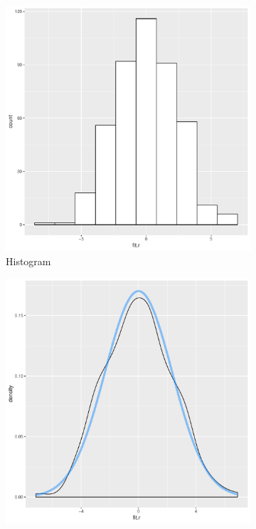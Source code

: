 \documentclass[11pt,openany]{book}\usepackage[]{graphicx}\usepackage[]{color}
\begin{document}
{\begin{figure}
        \centering
        \begin{subfigure}[b]{0.4\textwidth}
                \centering
                \includegraphics[width=\textwidth]{15_Diagnostics/multresidhist2.pdf} %
                \caption{Histogram \label{fig:multresidhist2}}
        \end{subfigure}
        \begin{subfigure}[b]{0.4\textwidth}
                \centering
                \includegraphics[width=\textwidth]{15_Diagnostics/multresidden2.pdf} %

\end{subfigure}
\end{figure}}
\end{document}
